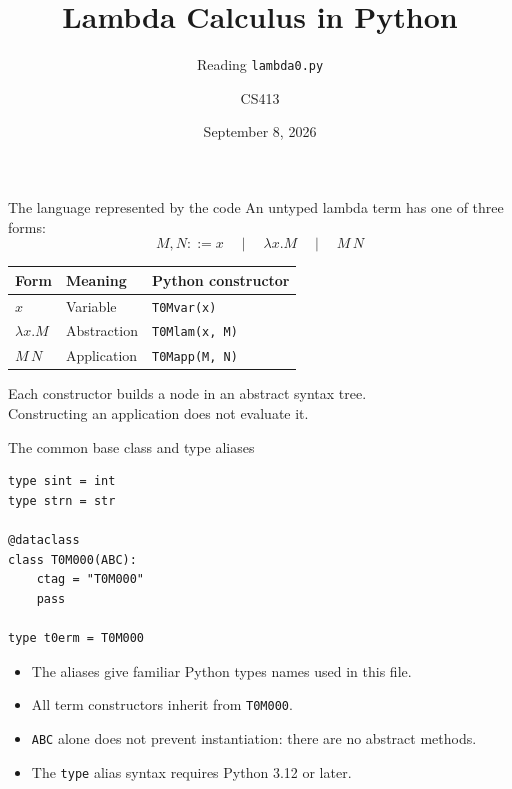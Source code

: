 \documentclass[aspectratio=169,11pt]{beamer}
\title{Lambda Calculus in Python}
\subtitle{Reading \texttt{lambda0.py}}
\author{CS413}
\date{September 8, 2026}
\begin{document}
\begin{frame}\titlepage\end{frame}

\begin{frame}{The language represented by the code}
An untyped lambda term has one of three forms:
\[
M,N ::= x \quad\mid\quad \lambda x.M \quad\mid\quad M\,N
\]
\begin{center}
\begin{tabular}{lll}\toprule
Form & Meaning & Python constructor\\\midrule
$x$ & Variable & \texttt{T0Mvar(x)}\\
$\lambda x.M$ & Abstraction & \texttt{T0Mlam(x, M)}\\
$M\,N$ & Application & \texttt{T0Mapp(M, N)}\\\bottomrule
\end{tabular}
\end{center}
\medskip
Each constructor builds a node in an abstract syntax tree.\\
Constructing an application does not evaluate it.
\end{frame}

\begin{frame}[fragile]{The common base class and type aliases}
\begin{lstlisting}
type sint = int
type strn = str

@dataclass
class T0M000(ABC):
    ctag = "T0M000"
    pass

type t0erm = T0M000
\end{lstlisting}
\begin{itemize}
\item The aliases give familiar Python types names used in this file.
\item All term constructors inherit from \texttt{T0M000}.
\item \texttt{ABC} alone does not prevent instantiation: there are no abstract methods.
\item The \texttt{type} alias syntax requires Python 3.12 or later.
\end{itemize}
\end{frame}
\end{document}
